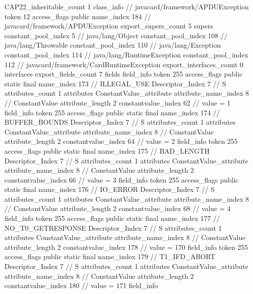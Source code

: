 {{{{{				}
			}
			CAP22_inheritable_count	1
		}
		class_info {		// javacard/framework/APDUException
			token	12
			access_flags	public
			name_index	184		// javacard/framework/APDUException
			export_supers_count	5
			supers {
				constant_pool_index	5		// java/lang/Object
				constant_pool_index	108		// java/lang/Throwable
				constant_pool_index	110		// java/lang/Exception
				constant_pool_index	114		// java/lang/RuntimeException
				constant_pool_index	112		// javacard/framework/CardRuntimeException
			}
			export_interfaces_count	0
			interfaces {
			}
			export_fields_count	7
			fields {
			field_info {
				token	255
				access_flags	public static final
				name_index	173		// ILLEGAL_USE
				Descriptor_Index	7		// S
				attributes_count	1
				attributes {
				ConstantValue_attribute {
					attribute_name_index	8		// ConstantValue
					attribute_length	2
					constantvalue_index	62		// value = 1
				}
				}
			}
			field_info {
				token	255
				access_flags	public static final
				name_index	174		// BUFFER_BOUNDS
				Descriptor_Index	7		// S
				attributes_count	1
				attributes {
				ConstantValue_attribute {
					attribute_name_index	8		// ConstantValue
					attribute_length	2
					constantvalue_index	64		// value = 2
				}
				}
			}
			field_info {
				token	255
				access_flags	public static final
				name_index	175		// BAD_LENGTH
				Descriptor_Index	7		// S
				attributes_count	1
				attributes {
				ConstantValue_attribute {
					attribute_name_index	8		// ConstantValue
					attribute_length	2
					constantvalue_index	66		// value = 3
				}
				}
			}
			field_info {
				token	255
				access_flags	public static final
				name_index	176		// IO_ERROR
				Descriptor_Index	7		// S
				attributes_count	1
				attributes {
				ConstantValue_attribute {
					attribute_name_index	8		// ConstantValue
					attribute_length	2
					constantvalue_index	68		// value = 4
				}
				}
			}
			field_info {
				token	255
				access_flags	public static final
				name_index	177		// NO_T0_GETRESPONSE
				Descriptor_Index	7		// S
				attributes_count	1
				attributes {
				ConstantValue_attribute {
					attribute_name_index	8		// ConstantValue
					attribute_length	2
					constantvalue_index	178		// value = 170
				}
				}
			}
			field_info {
				token	255
				access_flags	public static final
				name_index	179		// T1_IFD_ABORT
				Descriptor_Index	7		// S
				attributes_count	1
				attributes {
				ConstantValue_attribute {
					attribute_name_index	8		// ConstantValue
					attribute_length	2
					constantvalue_index	180		// value = 171
				}
				}
			}
			field_info {
}}}}}
